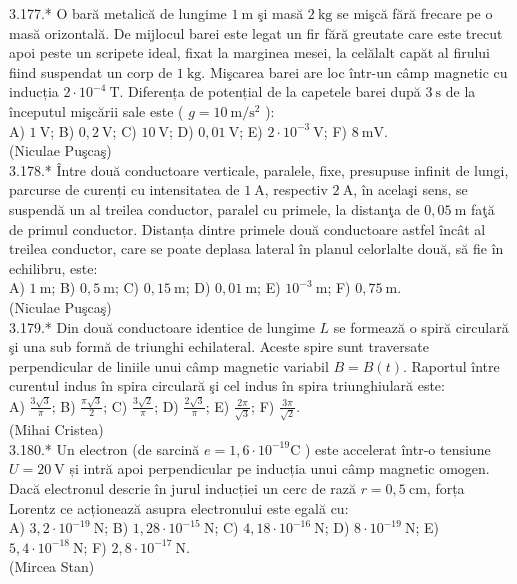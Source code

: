 3.177.* O bară metalică de lungime $1 \mathrm{~m}$ şi masă $2 \mathrm{~kg}$ se mişcă fără frecare pe o masă orizontală. De mijlocul barei este legat un fir fără greutate care este trecut apoi peste un scripete ideal, fixat la marginea mesei, la celălalt capăt al firului fiind suspendat un corp de $1 \mathrm{~kg}$. Mişcarea barei are loc într-un câmp magnetic cu inducția $2 \cdot 10^{-4} \mathrm{~T}$. Diferența de potențial de la capetele barei după $3 \mathrm{~s}$ de la începutul mişcării sale este ( $g=10 \mathrm{~m} / \mathrm{s}^{2}$ ):\\ A) $1 \mathrm{~V}$; B) $0,2 \mathrm{~V}$; C) $10 \mathrm{~V}$; D) $0,01 \mathrm{~V}$; E) $2 \cdot 10^{-3} \mathrm{~V}$; F) $8 \mathrm{~mV}$.\\ (Niculae Puşcaş)\\

3.178.* Între două conductoare verticale, paralele, fixe, presupuse infinit de lungi, parcurse de curenți cu intensitatea de $1 \mathrm{~A}$, respectiv $2 \mathrm{~A}$, în acelaşi sens, se suspendă un al treilea conductor, paralel cu primele, la distanţa de $0,05 \mathrm{~m}$ faţă de primul conductor. Distanța dintre primele două conductoare astfel încât al treilea conductor, care se poate deplasa lateral în planul celorlalte două, să fie în echilibru, este:\\ A) $1 \mathrm{~m}$; B) $0,5 \mathrm{~m}$; C) $0,15 \mathrm{~m}$; D) $0,01 \mathrm{~m}$; E) $10^{-3} \mathrm{~m}$; F) $0,75 \mathrm{~m}$.\\ (Niculae Puşcaş)\\

3.179.* Din două conductoare identice de lungime $L$ se formează o spiră circulară şi una sub formă de triunghi echilateral. Aceste spire sunt traversate perpendicular de liniile unui câmp magnetic variabil $B=B(t)$. Raportul între curentul indus în spira circulară şi cel indus în spira triunghiulară este:\\ A) $\frac{3 \sqrt{3}}{\pi}$; B) $\frac{\pi \sqrt{3}}{2}$; C) $\frac{3 \sqrt{2}}{\pi}$; D) $\frac{2 \sqrt{3}}{\pi}$; E) $\frac{2 \pi}{\sqrt{3}}$; F) $\frac{3 \pi}{\sqrt{2}}$.\\ (Mihai Cristea)\\

3.180.* Un electron (de sarcină $e=1,6 \cdot 10^{-19} \mathrm{C}$ ) este accelerat într-o tensiune $U=20 \mathrm{~V}$ și intră apoi perpendicular pe inducția unui câmp magnetic omogen. Dacă electronul descrie în jurul inducției un cerc de rază $r=0,5 \mathrm{~cm}$, forța Lorentz ce acționează asupra electronului este egală cu:\\ A) $3,2 \cdot 10^{-19} \mathrm{~N}$; B) $1,28 \cdot 10^{-15} \mathrm{~N}$; C) $4,18 \cdot 10^{-16} \mathrm{~N}$; D) $8 \cdot 10^{-19} \mathrm{~N}$; E) $5,4 \cdot 10^{-18} \mathrm{~N}$; F) $2,8 \cdot 10^{-17} \mathrm{~N}$.\\ (Mircea Stan)\\

